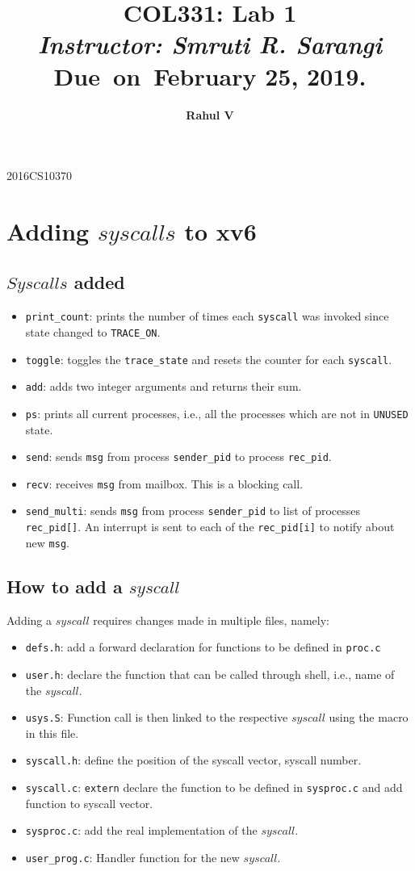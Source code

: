 \documentclass[12pt]{article}
\author{\textbf{Rahul V}}
\date{}
\title{
    \thispagestyle{empty}
    \vspace{0.2\textheight}
    \textbf{COL331: Lab 1} \\
    \vspace{0.01\textheight}
    \large \emph{Instructor: Smruti R. Sarangi} \\
    \vspace{0.01\textheight}
    \small Due\ on\ February 25, 2019.
    \vspace{0.2\textheight}
}
\newcommand{\genTitlePage} {
    \maketitle
    \begin{center}
        \vspace{-0.05\textheight}
        \large 2016CS10370
    \end{center}
}
\begin{document}
\genTitlePage
\clearpage
{}

\section{Adding $syscalls$ to xv6}
\subsection {$Syscalls$ added}
\begin{itemize}
    \item \texttt{print\_count}: prints the number of times each \texttt{syscall}
        was invoked since state changed to \texttt{TRACE\_ON}.
    \item \texttt{toggle}: toggles the \texttt{trace\_state} and resets the
        counter for each \texttt{syscall}.
    \item \texttt{add}: adds two integer arguments and returns their sum.
    \item \texttt{ps}: prints all current processes, i.e., all the processes
        which are not in \texttt{UNUSED} state.
    \item \texttt{send}: sends \texttt{msg} from process \texttt{sender\_pid} to
        process \texttt{rec\_pid}.
    \item \texttt{recv}: receives \texttt{msg} from mailbox. This is a blocking
        call.
    \item \texttt{send\_multi}: sends \texttt{msg} from process
        \texttt{sender\_pid} to list of processes \texttt{rec\_pid[]}. An interrupt
        is sent to each of the \texttt{rec\_pid[i]} to notify about new \texttt{msg}.
\end{itemize}
\subsection{How to add a $syscall$}
Adding a $syscall$ requires changes made in multiple files, namely:
\begin{itemize}
    \item \texttt{defs.h}: add a forward declaration for functions to be defined
        in \texttt{proc.c}
    \item \texttt{user.h}: declare the function that can be called through shell,
        i.e., name of the $syscall$.
    \item \texttt{usys.S}: Function call is then linked to the respective
        $syscall$ using the macro in this file.
    \item \texttt{syscall.h}: define the position of the syscall vector, syscall
        number.
    \item \texttt{syscall.c}: \texttt{extern} declare the function to be
        defined in \texttt{sysproc.c} and add function to syscall vector.
    \item \texttt{sysproc.c}: add the real implementation of the $syscall$.
    \item \texttt{user\_prog.c}: Handler function for the new $syscall$.
\end{itemize}
\end{document}

